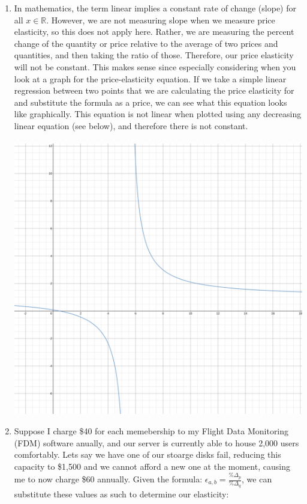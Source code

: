\documentclass[12pt]{article}
\begin{document}
\begin{enumerate}
    \\
    \\
    \\
    \\
    \\
    \\
    \\
    \\
\item
    In mathematics, the term linear implies a constant rate of change (slope) for all $x \in \mathbb{R}$. However, we are not measuring slope when we measure price elasticity, so this does not apply here. Rather, we are measuring the percent change of the quantity or price relative to the average of two prices and quantities, and then taking the ratio of those. Therefore, our price elasticity will not be constant. This makes sense since especially considering when you look at a graph for the price-elasticity equation. If we take a simple linear regression between two points that we are calculating the price elasticity for and substitute the formula as a price, we can see what this equation looks like graphically. This equation is not linear when plotted using any decreasing linear equation (see below), and therefore there is not constant.   \\
    \\
\includegraphics[scale=0.25]{invrad.png}
\item
Suppose I charge \$40 for each memebership to my Flight Data Monitoring (FDM) software anually, and our server is currently able to house 2,000 users comfortably. Lets say we have one of our stoarge disks fail, reducing this capacity to \$1,500 and we cannot afford a new one at the moment, causing me to now charge \$60 annually. Given the formula: $\epsilon_{a,b} = \frac{\% \Delta_p}{\% \Delta_q}$, we can substitute these values as such to determine our elasticity: \\

\end{enumerate}
\end{document}
